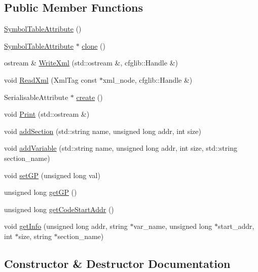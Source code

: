 \subsection*{Public Member Functions}
\begin{DoxyCompactItemize}
\item 
\hyperlink{classSymbolTableAttribute_a0540a38b6c87455ae69f989d45777cb7}{Symbol\+Table\+Attribute} ()
\item 
\hyperlink{classSymbolTableAttribute}{Symbol\+Table\+Attribute} $\ast$ \hyperlink{classSymbolTableAttribute_a0211a7147715180eb5cc7da65e72cf7d}{clone} ()
\item 
ostream \& \hyperlink{classSymbolTableAttribute_a8caf49a2a632b014a597acee79d3b4ce}{Write\+Xml} (std\+::ostream \&, cfglib\+::\+Handle \&)
\item 
void \hyperlink{classSymbolTableAttribute_ae3a962fbcb5eebcf2f5b9b25814d6714}{Read\+Xml} (Xml\+Tag const $\ast$xml\+\_\+node, cfglib\+::\+Handle \&)
\item 
Serialisable\+Attribute $\ast$ \hyperlink{classSymbolTableAttribute_aabc11b586cbe3f02b1d1b2838630fbb0}{create} ()
\item 
void \hyperlink{classSymbolTableAttribute_ab456077a4c556eec9ad24103689aa672}{Print} (std\+::ostream \&)
\item 
void \hyperlink{classSymbolTableAttribute_ac3d05fcd8b84f1b19e313ca35ab46b6a}{add\+Section} (std\+::string name, unsigned long addr, int size)
\item 
void \hyperlink{classSymbolTableAttribute_a37e4e5f0139566dfd77385ced03c1acb}{add\+Variable} (std\+::string name, unsigned long addr, int size, std\+::string section\+\_\+name)
\item 
void \hyperlink{classSymbolTableAttribute_a5cebeb90706d6570a12d4abd22ae0173}{set\+GP} (unsigned long val)
\item 
unsigned long \hyperlink{classSymbolTableAttribute_abb86ee2aeee7b78d4c93ee083fe7cdb6}{get\+GP} ()
\item 
unsigned long \hyperlink{classSymbolTableAttribute_a22e7e68ba19d0c9ea1d5ccfbe02336c2}{get\+Code\+Start\+Addr} ()
\item 
void \hyperlink{classSymbolTableAttribute_a6b87c838b987ba648eed8423323b5bf2}{get\+Info} (unsigned long addr, string $\ast$var\+\_\+name, unsigned long $\ast$start\+\_\+addr, int $\ast$size, string $\ast$section\+\_\+name)
\end{DoxyCompactItemize}


\subsection{Constructor \& Destructor Documentation}
\mbox{\label{classSymbolTableAttribute_a0540a38b6c87455ae69f989d45777cb7}} 
